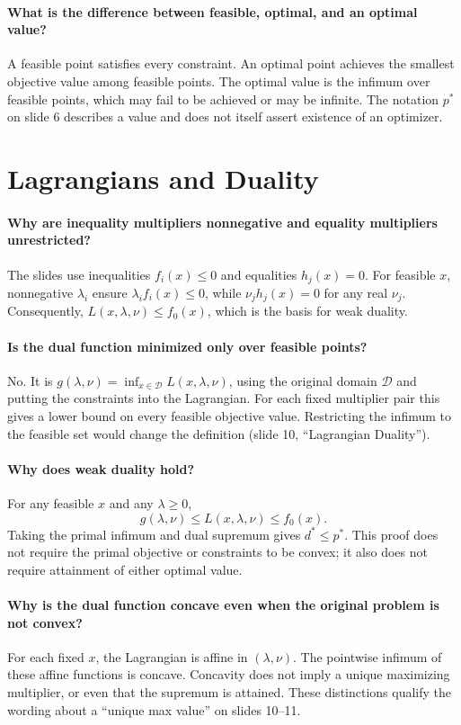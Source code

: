 \documentclass[10pt,english]{article}
\begin{document}
\paragraph{What is the difference between feasible, optimal, and an optimal value?}
A feasible point satisfies every constraint.
An optimal point achieves the smallest objective value among feasible points.
The optimal value is the infimum over feasible points, which may fail to be achieved or may be infinite.
The notation $p^*$ on slide 6 describes a value and does not itself assert existence of an optimizer.

\section{Lagrangians and Duality}

\paragraph{Why are inequality multipliers nonnegative and equality multipliers unrestricted?}
The slides use inequalities $f_i(x)\leq0$ and equalities $h_j(x)=0$.
For feasible $x$, nonnegative $\lambda_i$ ensure $\lambda_i f_i(x)\leq0$, while $\nu_jh_j(x)=0$ for any real $\nu_j$.
Consequently, $L(x,\lambda,\nu)\leq f_0(x)$, which is the basis for weak duality.

\paragraph{Is the dual function minimized only over feasible points?}
No. It is $g(\lambda,\nu)=\inf_{x\in\mathcal D}L(x,\lambda,\nu)$, using the original domain $\mathcal D$ and putting the constraints into the Lagrangian.
For each fixed multiplier pair this gives a lower bound on every feasible objective value.
Restricting the infimum to the feasible set would change the definition (slide 10, ``Lagrangian Duality'').

\paragraph{Why does weak duality hold?}
For any feasible $x$ and any $\lambda\geq0$,
\[
g(\lambda,\nu)\leq L(x,\lambda,\nu)\leq f_0(x).
\]
Taking the primal infimum and dual supremum gives $d^*\leq p^*$.
This proof does not require the primal objective or constraints to be convex; it also does not require attainment of either optimal value.

\paragraph{Why is the dual function concave even when the original problem is not convex?}
For each fixed $x$, the Lagrangian is affine in $(\lambda,\nu)$.
The pointwise infimum of these affine functions is concave.
Concavity does not imply a unique maximizing multiplier, or even that the supremum is attained.
These distinctions qualify the wording about a ``unique max value'' on slides 10--11.
\end{document}
